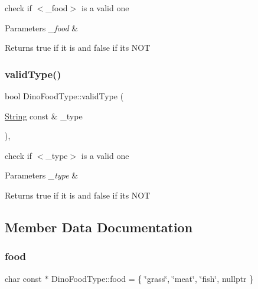 check if $<$\+\_\+food$>$ is a valid one 
\begin{DoxyParams}{Parameters}
{\em \+\_\+food} & \\
\hline
\end{DoxyParams}
\begin{DoxyReturn}{Returns}
true if it is and false if it\textquotesingle{}s N\+OT 
\end{DoxyReturn}
\mbox{\label{classDinoFoodType_a72f9411ead67e171a61268b499806b42}} 
\subsubsection{\texorpdfstring{valid\+Type()}{validType()}}
{\footnotesize\ttfamily bool Dino\+Food\+Type\+::valid\+Type (\begin{DoxyParamCaption}\item[{\hyperlink{classString}{String} const \&}]{\+\_\+type }\end{DoxyParamCaption})\hspace{0.3cm}{\ttfamily [static]}, {\ttfamily [private]}}

check if $<$\+\_\+type$>$ is a valid one 
\begin{DoxyParams}{Parameters}
{\em \+\_\+type} & \\
\hline
\end{DoxyParams}
\begin{DoxyReturn}{Returns}
true if it is and false if it\textquotesingle{}s N\+OT 
\end{DoxyReturn}


\subsection{Member Data Documentation}
\mbox{\label{classDinoFoodType_acb68d96669c399a87f3f6d2d19040564}} 
\subsubsection{\texorpdfstring{food}{food}}
{\footnotesize\ttfamily char const  $\ast$ Dino\+Food\+Type\+::food = \{ \char`\"{}grass\char`\"{}, \char`\"{}meat\char`\"{}, \char`\"{}fish\char`\"{}, nullptr \}\hspace{0.3cm}{\ttfamily [static]}}



